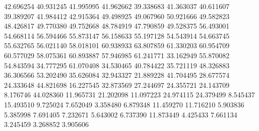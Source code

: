 42.696254
40.931245
41.995995
41.962662
39.338683
41.363037
40.611607
39.389207
41.984412
42.915364
49.498925
49.067960
50.921666
49.582823
48.426817
49.770380
49.752668
48.784919
47.790859
49.528375
56.493001
54.668114
56.594466
55.873147
56.158633
55.197128
54.543914
54.663745
55.632765
56.021140
58.018101
60.938933
63.807859
61.330203
60.954709
60.577029
58.075361
60.893887
57.946985
61.241771
33.162949
55.870082
54.843594
34.777295
61.070408
34.530465
40.784422
35.721119
48.326883
36.306566
53.202490
35.626084
32.943327
21.889228
41.704495
28.677574
24.333648
44.821698
16.227545
32.873569
27.244697
24.355721
24.143709
8.176746
44.028360
11.965731
21.202098
11.097223
24.974115
24.379499
8.545437
15.493510
9.725024
7.652049
3.358480
6.879348
11.459270
11.716210
5.903836
5.385998
7.691405
7.232671
5.643002
6.737390
11.873449
4.425433
7.661134
3.245459
3.268852
3.905606
